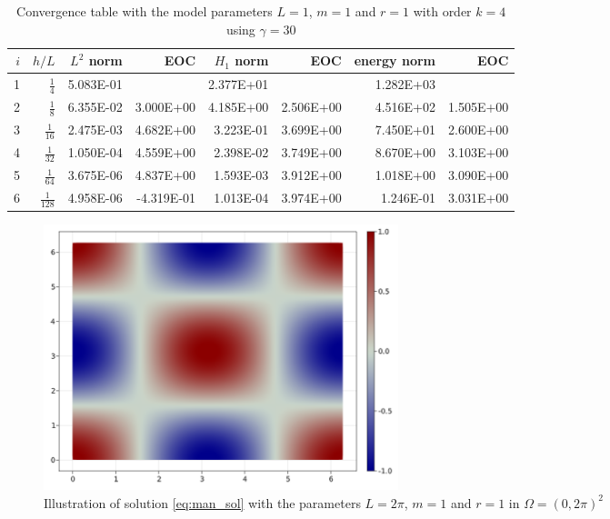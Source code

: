 \begin{table}
  \caption{\label{tab:ex1_order:c}Convergence table with the model parameters $L=1$, $m=1$ and $r=1$ with order $k=4$ using $ \gamma = 30$ }
  \begin{tabular}{rrrrrrrr}
    \hline\hline
    $i$&\textbf{$h/{L} $} & \textbf{$L^2$ norm} & \textbf{EOC} & \textbf{$H_1$ norm} & \textbf{EOC} & \textbf{energy norm} & \textbf{EOC} \\\hline
    1&$\frac{1}{4}$ & 5.083E-01 &  & 2.377E+01 &  & 1.282E+03 &  \\
    2&$\frac{1}{8}$ & 6.355E-02 & 3.000E+00 & 4.185E+00 & 2.506E+00 & 4.516E+02 & 1.505E+00 \\
    3&$\frac{1}{16}$ & 2.475E-03 & 4.682E+00 & 3.223E-01 & 3.699E+00 & 7.450E+01 & 2.600E+00 \\
    4&$\frac{1}{32}$ & 1.050E-04 & 4.559E+00 & 2.398E-02 & 3.749E+00 & 8.670E+00 & 3.103E+00 \\
    5&$\frac{1}{64}$ & 3.675E-06 & 4.837E+00 & 1.593E-03 & 3.912E+00 & 1.018E+00 & 3.090E+00 \\
    6&$\frac{1}{128}$ & 4.958E-06 & -4.319E-01 & 1.013E-04 & 3.974E+00 & 1.246E-01 & 3.031E+00 \\\hline\hline
  \end{tabular}
\end{table}

\newpage

\begin{figure}[tbh!]
    \centering
    \includegraphics[width=0.5\textwidth]{figures/model/l_6.28_m_1_r_1n_100_sol.png}
    \caption{Illustration of solution \eqref{eq:man_sol}   with the parameters $L=2\pi$, $m=1$ and $r=1$ in $\Omega = (0,2\pi)^2$}
    \label{fig:sol_l2pi_m1_r1}
\end{figure}


